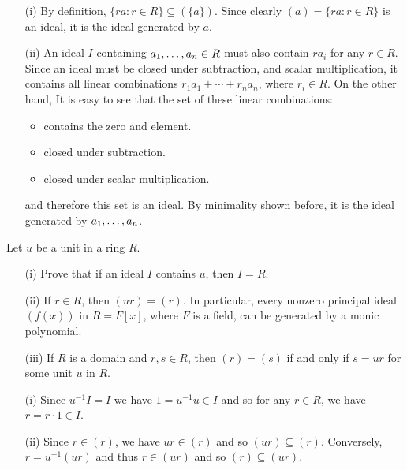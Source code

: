 \begin{myenumerate}
\begin{itemize}
 \item[(i)]
   By definition, \(\{ra:r\in R\} \subseteq (\{a\})\).
   Since clearly \((a)=\{ra:r\in R\}\) is an ideal, it is the ideal
   generated by $a$.
 \item[(ii)]
   An ideal $I$ containing \(a_1,\ldots,a_{n}\in R\) must also contain
   \(ra_i\) for any \(r\in R\). Since an ideal must be closed
   under subtraction, and scalar multiplication, it contains
   all linear combinations \(r_1a_1 + \cdots + r_na_n\), where
   \(r_i\in R\).
   On the other hand, It is easy to see that the set of these
   linear combinations:
   \begin{itemize}
     \item contains the zero and element.
     \item closed under subtraction.
     \item closed under scalar multiplication.
   \end{itemize}
   and therefore this set is an ideal. By minimality shown before,
   it is the ideal generated by \(a_1,\ldots,a_{n}\).
\end{itemize}
\label{ex:ei:ideal:generated}
\label{ex:ideal:generated}


\item
\begin{excopy}
Let $u$ be a unit in a ring $R$.
\begin{itemize}
 \item[(i)]
   Prove that if an ideal $I$ contains $u$, then \(I=R\).
 \item[(ii)]
   If \(r\in R\), then \((ur)=(r)\).
   In particular, every nonzero principal ideal
   \((f(x))\) in \(R=F[x]\), where $F$ is a field, can be generated by a monic
   polynomial.
 \item[(iii)]
   If $R$ is a domain and \(r,s\in R\), then \((r)=(s)\) if and only if
   \(s=ur\) for some unit $u$ in $R$.
\end{itemize}
\end{excopy}

\begin{itemize}
 \item[(i)]
    Since \(u^{-1}I=I\) we have \(1=u^{-1}u\in I\) and so
    for any \(r\in R\), we have \(r=r\cdot 1\in I\).
 \item[(ii)]
   Since \(r\in(r)\), we have \(ur\in(r)\) and so \((ur)\subseteq(r)\).
   Conversely, \(r=u^{-1}(ur)\) and thus \(r\in (ur)\)
   and so \((r)\subseteq(ur)\).


\end{itemize}
\end{myenumerate}
